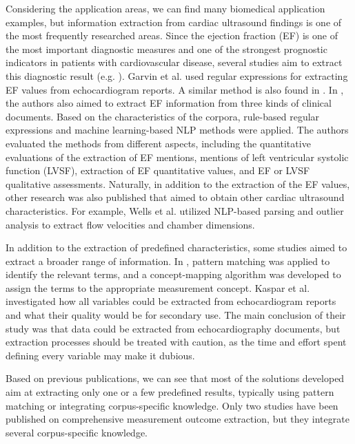 Considering the application areas, we can find many biomedical application examples, but information extraction from cardiac ultrasound findings is one of the most frequently researched areas. Since the ejection fraction (EF) is one of the most important diagnostic measures and one of the strongest prognostic indicators in patients with cardiovascular disease, several studies aim to extract this diagnostic result (e.g. \cite{garvin2012automated, kim2017extraction, xie2017extracting, vaid2022using}). Garvin et al. \cite{garvin2012automated} used regular expressions for extracting EF values from echocardiogram reports. A similar method is also found in \cite{jonnalagadda2017text}. In \cite{kim2017extraction}, the authors also aimed to extract EF information from three kinds of clinical documents. Based on the characteristics of the corpora, rule-based regular expressions and machine learning-based NLP methods were applied. The authors evaluated the methods from different aspects, including the quantitative evaluations of the extraction of EF mentions, mentions of left ventricular systolic function (LVSF), extraction of EF quantitative values, and EF or LVSF qualitative assessments. Naturally, in addition to the extraction of the EF values, other research was also published that aimed to obtain other cardiac ultrasound characteristics. For example, Wells et al. \cite{wells2014extraction} utilized NLP-based parsing and outlier analysis to extract flow velocities and chamber dimensions. 

In addition to the extraction of predefined characteristics, some studies aimed to extract a broader range of information. In \cite{patterson2017unlocking}, pattern matching was applied to identify the relevant terms, and a concept-mapping algorithm was developed to assign the terms to the appropriate measurement concept. Kaspar et al. \cite{kaspar2019information} investigated how all variables could be extracted from echocardiogram reports and what their quality would be for secondary use. The main conclusion of their study was that data could be extracted from echocardiography documents, but extraction processes should be treated with caution, as the time and effort spent defining every variable may make it dubious.

Based on previous publications, we can see that most of the solutions developed aim at extracting only one or a few predefined results, typically using pattern matching or integrating corpus-specific knowledge. Only two studies \cite{patterson2017unlocking, kaspar2019information} have been published on comprehensive measurement outcome extraction, but they integrate several corpus-specific knowledge.

